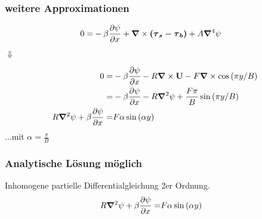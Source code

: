 \begin{frame}
\frametitle{weitere Approximationen}
\begin{align}
		0
	=& -\beta \frac{\partial\psi}{\partial x}  + \mathbf{\bm{\nabla}} \times \mathbf{\bm{\left( \mathbf{\tau}_{s}- \mathbf{\tau}_{b} \right)}}  + A  \mathbf{\bm{\nabla}}^{4} \psi \nonumber  
\end{align}
\begin{center}
	$\Downarrow$
\end{center}
\begin{align}
		0
	=& -\beta \frac{\partial\psi}{\partial x}  - R \mathbf{\bm{\nabla}} \times \mathbf{\bm{U}} - F \mathbf{\bm{\nabla}} \times  \cos{(\pi y / B)} \nonumber   \\
	=& -\beta \frac{\partial\psi}{\partial x}  - R \mathbf{\bm{\nabla}}^2 \psi + \frac{F\pi}{B} \sin{(\pi y / B)}\nonumber  \\
R \mathbf{\bm{\nabla}}^2 \psi+\beta \frac{\partial\psi}{\partial x}   
	=&
	 F\alpha \sin{(\alpha y )}
\end{align}
...mit $ \alpha	= \frac{\pi}{B} $
\end{frame}

\begin{frame}
\frametitle{Analytische Lösung möglich}
Inhomogene partielle Differentialgleichung 2er Ordnung.
\begin{align}
    R \mathbf{\bm{\nabla}}^2 \psi+\beta \frac{\partial\psi}{\partial x}   
	=&
	 F\alpha \sin{(\alpha y )}\nonumber 
\end{align}
\end{frame}




